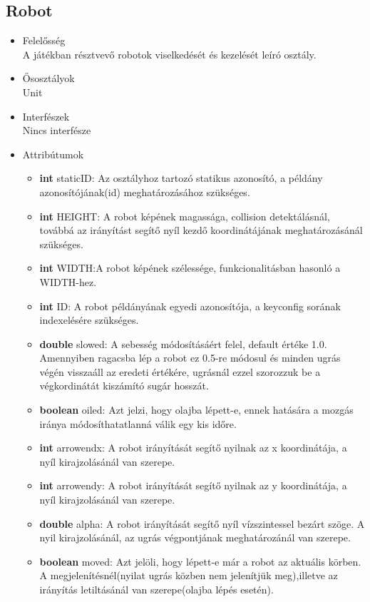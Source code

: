 \subsection{Robot}
\begin{itemize}
\item Felelősség\\
A játékban résztvevő robotok viselkedését és kezelését leíró osztály.
\item Ősosztályok\\
Unit
\item Interfészek\\
Nincs interfésze
\item Attribútumok
	\begin{itemize}
		\item \textbf{int} staticID: Az osztályhoz tartozó statikus azonosító, a példány                azonosítójának(id) meghatározásához szükséges.
		\item \textbf{int} HEIGHT: A robot képének magassága, collision                      detektálásnál, továbbá az irányítást segítő nyíl kezdő koordinátájának                  meghatározásánál szükséges.
		\item \textbf{int} WIDTH:A robot képének szélessége, funkcionalitásban hasonló a WIDTH-hez.
		\item \textbf{int} ID: A robot példányának egyedi azonosítója, a keyconfig sorának                     indexelésére szükséges.
		\item \textbf{double} slowed: A sebesség módosításáért felel, default értéke 1.0. Amennyiben ragacsba lép a robot ez 0.5-re módosul és minden ugrás végén visszaáll az eredeti értékére, ugrásnál ezzel szorozzuk be a végkordinátát kiszámító sugár hosszát.
		\item \textbf{boolean} oiled: Azt jelzi, hogy olajba lépett-e, ennek hatására a mozgás iránya módosíthatatlanná válik egy kis időre. 
		\item \textbf{int} arrowendx: A robot irányítását segítő nyilnak az x koordinátája, a nyíl kirajzolásánál van szerepe.
		\item \textbf{int} arrowendy: A robot irányítását segítő nyilnak az y koordinátája, a nyíl kirajzolásánál van szerepe.
		\item \textbf{double} alpha: A robot irányítását segítő nyíl vízszintessel bezárt szöge. A nyil kirajzolásánál, az ugrás végpontjának meghatározánál van szerepe.
		\item \textbf{boolean} moved: Azt jelöli, hogy lépett-e már a robot az aktuális körben. A megjelenítésnél(nyilat ugrás közben nem jelenítjük meg),illetve az irányítás letiltásánál van szerepe(olajba lépés esetén).

\end{itemize}
\end{itemize}

